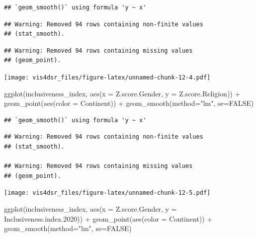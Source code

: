 \documentclass[
]{krantz}
\makeatletter
\newenvironment{Shaded}{\begin{snugshade}}{\end{snugshade}}
\newcommand{\AttributeTok}[1]{\textcolor[rgb]{0.61,0.61,0.61}{#1}}
\newcommand{\ConstantTok}[1]{\textcolor[rgb]{0,0,0}{#1}}
\newcommand{\FloatTok}[1]{\textcolor[rgb]{0.06,0.06,0.06}{#1}}
\newcommand{\FunctionTok}[1]{\textcolor[rgb]{0,0,0}{#1}}
\newcommand{\NormalTok}[1]{#1}
\newcommand{\SpecialCharTok}[1]{\textcolor[rgb]{0,0,0}{#1}}
\newcommand{\StringTok}[1]{\textcolor[rgb]{0.5,0.5,0.5}{#1}}
\newenvironment{kframe}{%
\medskip{}
\setlength{\fboxsep}{.8em}
 \def\at@end@of@kframe{}%
 \ifinner\ifhmode%
  \def\at@end@of@kframe{\end{minipage}}%
  \begin{minipage}{\columnwidth}%
 \fi\fi%
 \def\FrameCommand##1{\hskip\@totalleftmargin \hskip-\fboxsep
 \colorbox{shadecolor}{##1}\hskip-\fboxsep
     \hskip-\linewidth \hskip-\@totalleftmargin \hskip\columnwidth}%
 \MakeFramed {\advance\hsize-\width
   \@totalleftmargin\z@ \linewidth\hsize
   \@setminipage}}%
 {\par\unskip\endMakeFramed%
 \at@end@of@kframe}
\renewenvironment{Shaded}{\begin{kframe}}{\end{kframe}}
\makeatother
\begin{document}
\begin{verbatim}
## `geom_smooth()` using formula 'y ~ x'
\end{verbatim}

\begin{verbatim}
## Warning: Removed 94 rows containing non-finite values
## (stat_smooth).
\end{verbatim}

\begin{verbatim}
## Warning: Removed 94 rows containing missing values
## (geom_point).
\end{verbatim}

\texttt{[image: vis4dsr\_files/figure-latex/unnamed-chunk-12-4.pdf]}

\begin{Shaded}
\begin{Highlighting}[]
\FunctionTok{ggplot}\NormalTok{(inclusiveness\_index, }
       \FunctionTok{aes}\NormalTok{(}\AttributeTok{x =}\NormalTok{ Z.score.Gender, }
           \AttributeTok{y =}\NormalTok{ Z.score.Religion)) }\SpecialCharTok{+}
  \FunctionTok{geom\_point}\NormalTok{(}\FunctionTok{aes}\NormalTok{(}\AttributeTok{color =}\NormalTok{ Continent)) }\SpecialCharTok{+}
  \FunctionTok{geom\_smooth}\NormalTok{(}\AttributeTok{method=}\StringTok{"lm"}\NormalTok{, }\AttributeTok{se=}\ConstantTok{FALSE}\NormalTok{)}
\end{Highlighting}
\end{Shaded}

\begin{verbatim}
## `geom_smooth()` using formula 'y ~ x'
\end{verbatim}

\begin{verbatim}
## Warning: Removed 94 rows containing non-finite values
## (stat_smooth).

## Warning: Removed 94 rows containing missing values
## (geom_point).
\end{verbatim}

\texttt{[image: vis4dsr\_files/figure-latex/unnamed-chunk-12-5.pdf]}

\begin{Shaded}
\begin{Highlighting}[]
\FunctionTok{ggplot}\NormalTok{(inclusiveness\_index, }
       \FunctionTok{aes}\NormalTok{(}\AttributeTok{x =}\NormalTok{ Z.score.Gender, }
           \AttributeTok{y =}\NormalTok{ Inclusiveness.index}\FloatTok{.2020}\NormalTok{)) }\SpecialCharTok{+}
  \FunctionTok{geom\_point}\NormalTok{(}\FunctionTok{aes}\NormalTok{(}\AttributeTok{color =}\NormalTok{ Continent)) }\SpecialCharTok{+}
  \FunctionTok{geom\_smooth}\NormalTok{(}\AttributeTok{method=}\StringTok{"lm"}\NormalTok{, }\AttributeTok{se=}\ConstantTok{FALSE}\NormalTok{)}
\end{Highlighting}
\end{Shaded}
\end{document}
